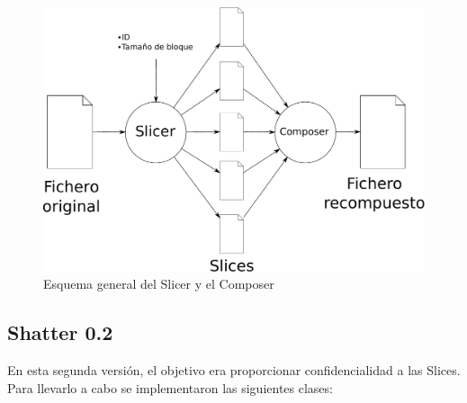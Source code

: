 \begin{figure}[ht]
  \centering
  \includegraphics[scale=0.5]{Figures/Assembler}
  \decoRule
  \caption[Slicer - Composer]{Esquema general del Slicer y el Composer}
  \label{fig:Assembler}
\end{figure}

\subsection{Shatter 0.2}

En esta segunda versión, el objetivo era proporcionar confidencialidad a las
Slices. Para llevarlo a cabo se implementaron las siguientes clases:

